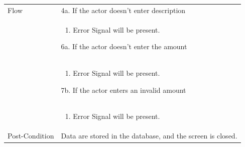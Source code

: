 \documentclass[12pt,a4paper]{report}
\begin{document}
\begin{tabular}{ | m{3cm} | m{12cm}| } \hline
Flow & 
4a. If the actor doesn't enter description \\ 	
&	\begin{enumerate}
		\item Error Signal will be present.
	\end{enumerate}
6a. If the actor doesn't enter the amount\\ 	
&	\begin{enumerate}
		\item Error Signal will be present.
	\end{enumerate}
7b. If the actor enters an invalid amount\\ 	
&	\begin{enumerate}
		\item Error Signal will be present.
	\end{enumerate}
\\ \hline
Post-Condition & Data are stored in the database, and the screen is closed.  \\\hline
\end{tabular}
\end{document}
